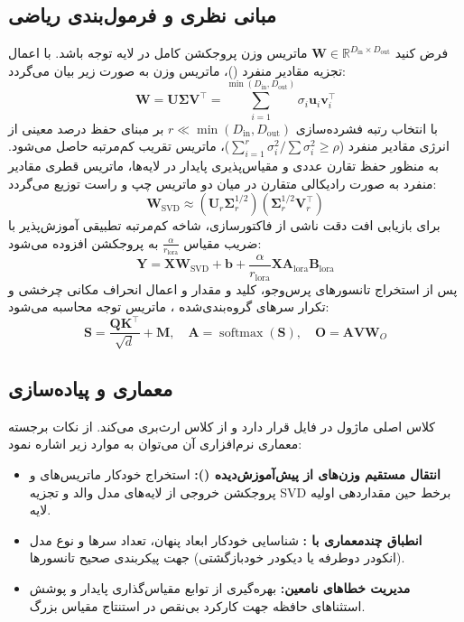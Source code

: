 \subsection{مبانی نظری و فرمول‌بندی ریاضی}
فرض کنید $\mathbf{W} \in \mathbb{R}^{D_{\text{in}} \times D_{\text{out}}}$ ماتریس وزن پروجکشن کامل در لایه توجه باشد. با اعمال تجزیه مقادیر منفرد ()، ماتریس وزن به صورت زیر بیان می‌گردد:
\begin{equation}
\mathbf{W} = \mathbf{U} \mathbf{\Sigma} \mathbf{V}^\top = \sum_{i=1}^{\min(D_{\text{in}}, D_{\text{out}})} \sigma_i \mathbf{u}_i \mathbf{v}_i^\top
\end{equation}
با انتخاب رتبه فشرده‌سازی $r \ll \min(D_{\text{in}}, D_{\text{out}})$ بر مبنای حفظ درصد معینی از انرژی مقادیر منفرد ($\sum_{i=1}^r \sigma_i^2 / \sum \sigma_i^2 \ge \rho$)، ماتریس تقریب کم‌مرتبه حاصل می‌شود. به منظور حفظ تقارن عددی و مقیاس‌پذیری پایدار در لایه‌ها، ماتریس قطری مقادیر منفرد به صورت رادیکالی متقارن در میان دو ماتریس چپ و راست توزیع می‌گردد:
\begin{equation}
\mathbf{W}_{\text{SVD}} \approx \left(\mathbf{U}_r \mathbf{\Sigma}_r^{1/2}\right) \left(\mathbf{\Sigma}_r^{1/2} \mathbf{V}_r^\top\right)
\end{equation}
برای بازیابی افت دقت ناشی از فاکتورسازی، شاخه کم‌مرتبه تطبیقی آموزش‌پذیر  با ضریب مقیاس $\frac{\alpha}{r_{\text{lora}}}$ به پروجکشن افزوده می‌شود:
\begin{equation}
\mathbf{Y} = \mathbf{X} \mathbf{W}_{\text{SVD}} + \mathbf{b} + \frac{\alpha}{r_{\text{lora}}} \mathbf{X} \mathbf{A}_{\text{lora}} \mathbf{B}_{\text{lora}}
\end{equation}
پس از استخراج تانسورهای پرس‌وجو، کلید و مقدار و اعمال انحراف مکانی چرخشی  و تکرار سرهای گروه‌بندی‌شده ، ماتریس توجه محاسبه می‌شود:
\begin{equation}
\mathbf{S} = \frac{\mathbf{Q} \mathbf{K}^\top}{\sqrt{d}} + \mathbf{M}, \quad \mathbf{A} = \operatorname{softmax}(\mathbf{S}), \quad \mathbf{O} = \mathbf{A} \mathbf{V} \mathbf{W}_O
\end{equation}

\subsection{معماری و پیاده‌سازی}
کلاس اصلی ماژول  در فایل  قرار دارد و از کلاس  ارث‌بری می‌کند. از نکات برجسته معماری نرم‌افزاری آن می‌توان به موارد زیر اشاره نمود:
\begin{itemize}
    \item \textbf{انتقال مستقیم وزن‌های از پیش‌آموزش‌دیده ():} استخراج خودکار ماتریس‌های  و پروجکشن خروجی از لایه‌های مدل والد و تجزیه SVD برخط حین مقداردهی اولیه لایه.
    \item \textbf{انطباق چندمعماری با :} شناسایی خودکار ابعاد پنهان، تعداد سرها و نوع مدل (انکودر دوطرفه یا دیکودر خودبازگشتی) جهت پیکربندی صحیح تانسورها.
    \item \textbf{مدیریت خطاهای نامعین:} بهره‌گیری از توابع مقیاس‌گذاری پایدار و پوشش استثناهای حافظه جهت کارکرد بی‌نقص در استنتاج مقیاس بزرگ.
\end{itemize}

